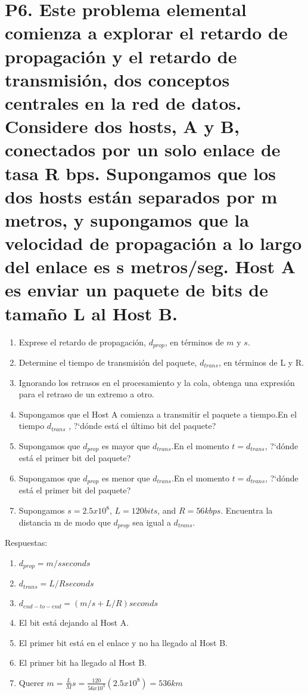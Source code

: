 \documentclass[a4paper, 11pt]{article}
\theoremstyle{definition} \theoremstyle{remark}
\begin{document}
     \section{P6. Este problema elemental comienza a explorar el retardo de propagaci\'on y el retardo de transmisi\'on, dos conceptos centrales en la red de datos. Considere dos hosts, A y B, conectados por un solo enlace de tasa R bps. Supongamos que los dos hosts est\'an separados por m metros, y supongamos que la velocidad de propagaci\'on a lo largo del enlace es s metros/seg. Host A es enviar un paquete de bits de tama\~{n}o L al Host B.}
      \renewcommand{\theenumi}{\alph{enumi}}
      \begin{enumerate}
        \item Exprese el retardo de propagaci\'on, $d_{prop}$, en t\'erminos de $m$ y $s$.
        \item Determine el tiempo de transmisi\'on del paquete, $d_{trans}$, en t\'erminos de L y R.
        \item Ignorando los retrasos en el procesamiento y la cola, obtenga una expresi\'on para el retraso de un extremo a otro.
        \item Supongamos que el Host A comienza a transmitir el paquete a tiempo.En el tiempo $d_{trans}$ , ?`d\'onde está el \'ultimo bit del paquete?
        \item Supongamos que $d_{prop}$ es mayor que $d_{trans}$.En el momento $t =d_{trans}$, ?`d\'onde est\'a el primer bit del paquete?
        \item Supongamos que $d_{prop}$ es menor que $d_{trans}$.En el momento $t =d_{trans}$, ?`d\'onde est\'a el primer bit del paquete?
        \item Supongamos $s=2.5x10^8$, $L=120 bits$, and $R=56kbps$. Encuentra la distancia m de modo que $d_{prop}$ sea igual a $d_{trans}$.
      \end{enumerate}
      Respuestas:
      \renewcommand{\theenumi}{\alph{enumi}}
      \begin{enumerate}
        \item $d_{prop} = m/s seconds$
        \item $d_{trans} = L/R seconds$
        \item $d_{end-to-end} = (m/s + L/R) seconds$
        \item El bit est\'a dejando al Host A.
        \item El primer bit est\'a en el enlace y no ha llegado al Host B.
        \item El primer bit ha llegado al Host B.
        \item Querer $m=\frac{L}{M}s = \frac{120}{56x10^3}(2.5x10^8) = 536km$
      \end{enumerate}
\end{document}
